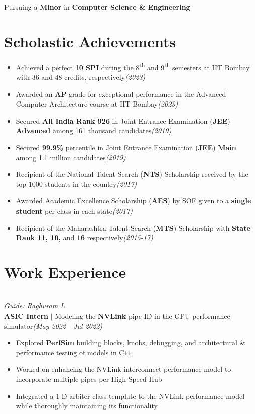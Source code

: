 \documentclass[10pt, a4paper]{article}
\newcommand{\lhsmall}[1]{{\small{\textit{#1}}}}
\newcommand{\rhsmall}[1]{\hfill{\footnotesize{\textsl{(#1)}}}}
\newcommand{\rhsmalle}[1]{\hfill{\footnotesize{\textsl{(#1)}}}\\[-12pt]}
\newcommand{\CFont}{\fontsize{11}{13.2}\selectfont}
\newcommand{\head}[1]{\vspace{0.2em}{\CFont{\textbf{#1}}}}
\begin{document}
\thispagestyle{firstpage}
Pursuing a \textbf{Minor} in \textbf{Computer Science \& Engineering}
\section{Scholastic Achievements}
\begin{itemize}
	\item Achieved a perfect \textbf{10 SPI} during the 8\textsuperscript{th} and 9\textsuperscript{th} semesters at IIT Bombay with 36 and 48 credits, respectively\rhsmall{2023}%
	\item Awarded an \textbf{AP} grade for exceptional performance in the Advanced Computer Architecture course at IIT Bombay\rhsmall{2023}
	\item Secured \textbf{All India Rank 926} in Joint Entrance Examination (\textbf{JEE}) \textbf{Advanced} among 161 thousand candidates\rhsmall{2019}
	\item Secured \textbf{99.9\%} percentile in Joint Entrance Examination (\textbf{JEE}) \textbf{Main} among 1.1 million candidates\rhsmall{2019}
	\item Recipient of the National Talent Search (\textbf{NTS}) Scholarship received by the top 1000 students in the country\rhsmall{2017}
	\item Awarded Academic Excellence Scholarship (\textbf{AES}) by SOF given to a \textbf{single  student} per class in each state\rhsmall{2017}%
	\item Recipient of the Maharashtra Talent Search (\textbf{MTS}) Scholarship  with \textbf{State Rank 11, 10,} and \textbf{16} respectively\rhsmall{2015-17}%
\end{itemize}
\section{Work Experience}
\vspace{-0.2em}
\head{NVIDIA $\mid$ GPU Subsystem}\\
\lhsmall{Guide: Raghuram L}\\
{\small\textbf{ASIC Intern} $\mid$ Modeling the \textbf{NVLink} pipe ID in the GPU performance simulator}\rhsmalle{May 2022 - Jul 2022}
\begin{itemize}
	\item Explored \textbf{PerfSim} building blocks, knobs, debugging, and architectural \& performance testing of models in C\texttt{++}
	\item Worked on enhancing the NVLink interconnect performance model to incorporate multiple pipes per High-Speed Hub%
	\item Integrated a 1-D arbiter class template to the NVLink performance model while thoroughly maintaining its functionality
\end{itemize}
\end{document}
